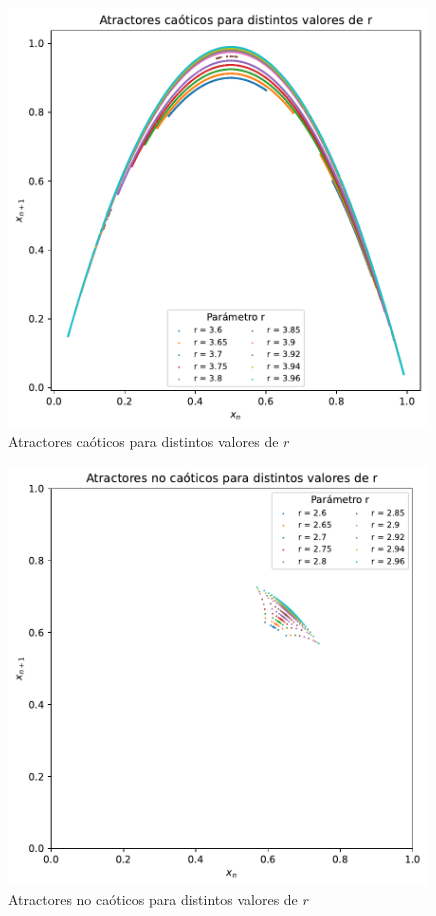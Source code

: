 \documentclass[
  10pt,
  a4paper,
  DIV=11,
  numbers=noendperiod,
  open=any]{scrreprt}
\numberwithin{equation}{chapter}
\numberwithin{equation}{section}
\renewcommand{\[}{\begin{equation}}
\renewcommand{\]}{\end{equation}}
\begin{document}
\begin{figure}[h]
  \centering
  \includegraphics[width=0.99\textwidth]{04-clima/atractor_files/figure-pdf/cell-7-output-1.pdf}
  \caption{Atractores caóticos para distintos valores de $r$}
\end{figure}

\begin{figure}[h]
  \centering
  \includegraphics[width=0.99\textwidth]{04-clima/atractor_files/figure-pdf/cell-8-output-1.pdf}
  \caption{Atractores no caóticos para distintos valores de $r$}
\end{figure}
\end{document}
